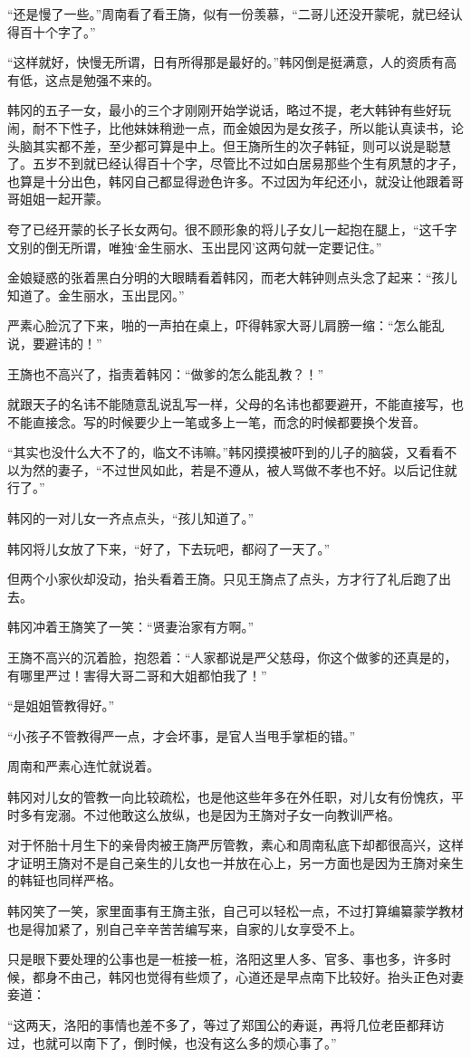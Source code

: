 “还是慢了一些。”周南看了看王旖，似有一份羡慕，“二哥儿还没开蒙呢，就已经认得百十个字了。”

“这样就好，快慢无所谓，日有所得那是最好的。”韩冈倒是挺满意，人的资质有高有低，这点是勉强不来的。

韩冈的五子一女，最小的三个才刚刚开始学说话，略过不提，老大韩钟有些好玩闹，耐不下性子，比他妹妹稍逊一点，而金娘因为是女孩子，所以能认真读书，论头脑其实都不差，至少都可算是中上。但王旖所生的次子韩钲，则可以说是聪慧了。五岁不到就已经认得百十个字，尽管比不过如白居易那些个生有夙慧的才子，也算是十分出色，韩冈自己都显得逊色许多。不过因为年纪还小，就没让他跟着哥哥姐姐一起开蒙。

夸了已经开蒙的长子长女两句。很不顾形象的将儿子女儿一起抱在腿上，“这千字文别的倒无所谓，唯独‘金生丽水、玉出昆冈’这两句就一定要记住。”

金娘疑惑的张着黑白分明的大眼睛看着韩冈，而老大韩钟则点头念了起来：“孩儿知道了。金生丽水，玉出昆冈。”

严素心脸沉了下来，啪的一声拍在桌上，吓得韩家大哥儿肩膀一缩：“怎么能乱说，要避讳的！”

王旖也不高兴了，指责着韩冈：“做爹的怎么能乱教？！”

就跟天子的名讳不能随意乱说乱写一样，父母的名讳也都要避开，不能直接写，也不能直接念。写的时候要少上一笔或多上一笔，而念的时候都要换个发音。

“其实也没什么大不了的，临文不讳嘛。”韩冈摸摸被吓到的儿子的脑袋，又看看不以为然的妻子，“不过世风如此，若是不遵从，被人骂做不孝也不好。以后记住就行了。”

韩冈的一对儿女一齐点点头，“孩儿知道了。”

韩冈将儿女放了下来，“好了，下去玩吧，都闷了一天了。”

但两个小家伙却没动，抬头看着王旖。只见王旖点了点头，方才行了礼后跑了出去。

韩冈冲着王旖笑了一笑：“贤妻治家有方啊。”

王旖不高兴的沉着脸，抱怨着：“人家都说是严父慈母，你这个做爹的还真是的，有哪里严过！害得大哥二哥和大姐都怕我了！”

“是姐姐管教得好。”

“小孩子不管教得严一点，才会坏事，是官人当甩手掌柜的错。”

周南和严素心连忙就说着。

韩冈对儿女的管教一向比较疏松，也是他这些年多在外任职，对儿女有份愧疚，平时多有宠溺。不过他敢这么放纵，也是因为王旖对子女一向教训严格。

对于怀胎十月生下的亲骨肉被王旖严厉管教，素心和周南私底下却都很高兴，这样才证明王旖对不是自己亲生的儿女也一并放在心上，另一方面也是因为王旖对亲生的韩钲也同样严格。

韩冈笑了一笑，家里面事有王旖主张，自己可以轻松一点，不过打算编纂蒙学教材也是得加紧了，别自己辛辛苦苦编写来，自家的儿女享受不上。

只是眼下要处理的公事也是一桩接一桩，洛阳这里人多、官多、事也多，许多时候，都身不由己，韩冈也觉得有些烦了，心道还是早点南下比较好。抬头正色对妻妾道：

“这两天，洛阳的事情也差不多了，等过了郑国公的寿诞，再将几位老臣都拜访过，也就可以南下了，倒时候，也没有这么多的烦心事了。”

